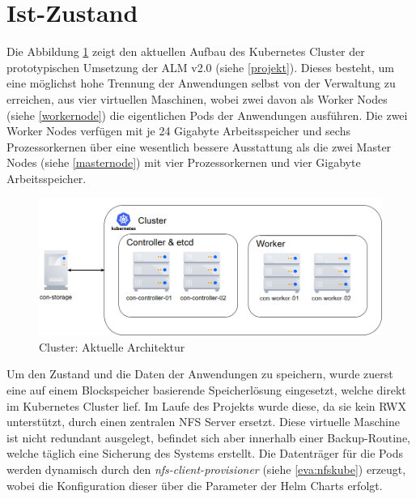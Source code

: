 \section{Ist-Zustand}
Die Abbildung \ref{fig:clusteralt} zeigt den aktuellen Aufbau des Kubernetes Cluster der prototypischen Umsetzung der ALM v2.0 (siehe \ref{projekt}). Dieses besteht, um eine möglichst hohe Trennung der Anwendungen selbst von der Verwaltung zu erreichen, aus vier virtuellen Maschinen, wobei zwei davon als Worker Nodes (siehe \ref{workernode}) die eigentlichen Pods der Anwendungen ausführen. Die zwei Worker Nodes verfügen mit je 24 Gigabyte Arbeitsspeicher und sechs Prozessorkernen über eine wesentlich bessere Ausstattung als die zwei Master Nodes (siehe \ref{masternode}) mit vier Prozessorkernen und vier Gigabyte Arbeitsspeicher.
\begin{figure}[htb]
\centering
\includegraphics[width=1\textwidth,angle=0]{gfx/cluster_alt.png}
\caption[Cluster: Aktuelle Architektur]{Cluster: Aktuelle Architektur}
\label{fig:clusteralt}
\end{figure}
Um den Zustand und die Daten der Anwendungen zu speichern, wurde zuerst eine auf einem Blockspeicher basierende Speicherlösung eingesetzt, welche direkt im Kubernetes Cluster lief. Im Laufe des Projekts wurde diese, da sie kein \ac{RWX} unterstützt, durch einen zentralen NFS Server ersetzt. Diese virtuelle Maschine ist nicht redundant ausgelegt, befindet sich aber innerhalb einer Backup-Routine, welche täglich eine Sicherung des Systems erstellt. Die Datenträger für die Pods werden dynamisch durch den \textit{nfs-client-provisioner} (siehe \ref{eva:nfskube}) erzeugt, wobei die Konfiguration dieser über die Parameter der Helm Charts erfolgt.

